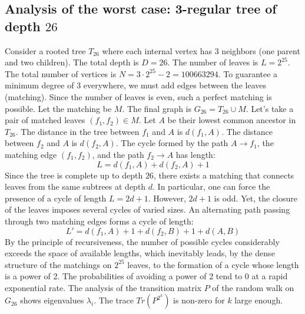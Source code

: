\documentclass[12pt,a4paper]{article}
\begin{document}
\subsection{Analysis of the worst case: 3-regular tree of depth $26$}
Consider a rooted tree $T_{26}$ where each internal vertex has 3 neighbors (one parent and two children).
The total depth is $D = 26$.
The number of leaves is $L = 2^{25}$.
The total number of vertices is $N = 3 \cdot 2^{25} - 2 = 100663294$.
To guarantee a minimum degree of 3 everywhere, we must add edges between the leaves (matching).
Since the number of leaves is even, such a perfect matching is possible.
Let the matching be $M$. The final graph is $G_{26} = T_{26} \cup M$.
Let's take a pair of matched leaves $(f_1, f_2) \in M$.
Let $A$ be their lowest common ancestor in $T_{26}$.
The distance in the tree between $f_1$ and $A$ is $d(f_1, A)$.
The distance between $f_2$ and $A$ is $d(f_2, A)$.
The cycle formed by the path $A \to f_1$, the matching edge $(f_1, f_2)$, and the path $f_2 \to A$ has length:
$$ L = d(f_1, A) + d(f_2, A) + 1 $$
Since the tree is complete up to depth $26$, there exists a matching that connects leaves from the same subtrees at depth $d$.
In particular, one can force the presence of a cycle of length $L = 2d + 1$. However, $2d+1$ is odd.
Yet, the closure of the leaves imposes several cycles of varied sizes. An alternating path passing through two matching edges forms a cycle of length:
$$ L' = d(f_1, A) + 1 + d(f_2, B) + 1 + d(A, B) $$
By the principle of recursiveness, the number of possible cycles considerably exceeds the space of available lengths, which inevitably leads, by the dense structure of the matchings on $2^{25}$ leaves, to the formation of a cycle whose length is a power of 2. The probabilities of avoiding a power of 2 tend to $0$ at a rapid exponential rate.
The analysis of the transition matrix $P$ of the random walk on $G_{26}$ shows eigenvalues $\lambda_i$. The trace $Tr(P^{2^k})$ is non-zero for $k$ large enough.
\end{document}
